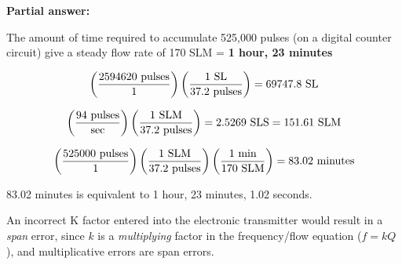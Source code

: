 





\noindent
{\bf Partial answer:}

\vskip 10pt

The amount of time required to accumulate 525,000 pulses (on a digital counter circuit) give a steady flow rate of 170 SLM = {\bf 1 hour, 23 minutes}







$$\left({2594620 \hbox{ pulses} \over 1} \right) \left( {1 \hbox{ SL} \over 37.2 \hbox{ pulses}} \right) = 69747.8 \hbox{ SL}$$

\vskip 10pt

$$\left( {94 \hbox{ pulses} \over \hbox{sec}} \right) \left( {1 \hbox{ SLM} \over 37.2 \hbox{ pulses}} \right) = 2.5269 \hbox{ SLS} = 151.61 \hbox{ SLM}$$

\vskip 10pt

$$\left( {525000 \hbox{ pulses} \over 1} \right) \left( {1 \hbox{ SLM} \over 37.2 \hbox{ pulses}} \right) \left( {1 \hbox{ min} \over 170 \hbox{ SLM}} \right) = 83.02 \hbox{ minutes}$$

83.02 minutes is equivalent to 1 hour, 23 minutes, 1.02 seconds.

\vskip 10pt

An incorrect K factor entered into the electronic transmitter would result in a {\it span} error, since $k$ is a {\it multiplying} factor in the frequency/flow equation ($f = kQ$), and multiplicative errors are span errors.





